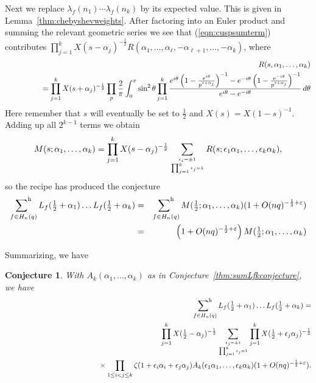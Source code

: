 \documentclass[12pt,letterpaper]{amsart}
\theoremstyle{plain}
\newtheorem{conjecture}[theorem]{Conjecture}
\theoremstyle{definition}
\theoremstyle{remark}
\numberwithin{equation}{subsection}
\numberwithin{theorem}{subsection}
\numberwithin{table}{subsection}
\def\({\left(}
\def\){\right)}
\newcommand{\ontop}[2]{\genfrac{}{}{0pt}{}{#1}{#2}}
\def\sumhar{\operatornamewithlimits{\sum\nolimits^h}}
\begin{document}
Next we replace $\lambda_f(n_1)\cdots \lambda_f(n_k)$ by its
expected value. This is given in Lemma~\ref{thm:chebyshevweights}.
After factoring into an Euler product and summing the relevant
geometric series we see that (\ref{eqn:cuspsumterm}) contributes
$\prod_{j=1}^k
X(s-\alpha_j)^{-\frac12}R(\alpha_1,\dots,\alpha_\ell,-\alpha_{\ell+1},\dots,-\alpha_{k})$,
where
\begin{eqnarray}
&&R(s,\alpha_1,\dots,\alpha_{k})   \cr &&\phantom{XXXX}=
\prod_{j=1}^k X(s +\alpha_j)^{-\frac12 } \prod_p
\frac{2}{\pi}\int_0^\pi \sin^2\theta\prod_{j=1}^k
\frac{e^{i\theta}\left(1-\frac{e^{i\theta}}{p^{s+\alpha_j}}
\right)^{-1} -e^{-i\theta}
\left(1-\frac{e^{-i\theta}}{p^{s+\alpha_j}}\right)^{-1}}{e^{i\theta}-e^{-i\theta}}\,d\theta
\end{eqnarray}
Here remember that $s$ will eventually be set to $\frac12$ and
$X(s)=X(1-s)^{-1}$.  Adding up all $2^{k-1}$ terms we obtain
\begin{equation}
M(s;\alpha_1,\dots,\alpha_k) =
\prod_{j=1}^kX(s-\alpha_j)^{-\frac12}\sum_{\ontop{\epsilon_i=\pm
1}{\prod_{j=1}^k \epsilon_j=1}} R(s; \epsilon_1\alpha_1, \dots,
\epsilon_k\alpha_k),
\end{equation}
so the recipe has produced the conjecture
\begin{eqnarray}
\sumhar_{f\in H_n(q)} L_f(\tfrac12 +\alpha_1)\dots L_f(\tfrac12
+\alpha_k) &=&\sumhar_{f\in H_n(q)}
M(\tfrac12;\alpha_1,\dots,\alpha_k) (1+ O(nq)^{-\frac
12+\varepsilon}) \cr &=& 
\(1+O(nq)^{-\frac12+\varepsilon}\)
M(\tfrac12;\alpha_1,\dots,\alpha_k)
\end{eqnarray}


Summarizing, we have
\begin{conjecture} \label{thm:Zfsumall}
 With
$A_k(\alpha_1,\dots, \alpha_k)$ as in
Conjecture~\ref{thm:sumLfkconjecture}, we have
\begin{eqnarray}&   &\sumhar_{f\in H_n(q)}L_f(\tfrac12 +\alpha_1)\dots L_f(\tfrac12 +\alpha_k)=\nonumber \\
&   &\phantom{xxxxxxxxxx}
    \prod_{j=1}^k X(\tfrac12-\alpha_j)^{-\frac12}\sum _{ \ontop{\epsilon_j=\pm 1}{\prod_{j=1}^k\epsilon_j=1 }}
\prod_{j=1}^k X(\tfrac12 +\epsilon_j\alpha_j)^{-\frac12 }
\nonumber \\
&   &\phantom{xxxxxxxxxxxxxxxxxxxx}\times\prod_{1\le i<j\le
k}\zeta(1+\epsilon_i\alpha_i +\epsilon_j\alpha_j)
 A_k(\epsilon_1\alpha_1,\dots,\epsilon_k\alpha_k)(1 +O(nq)^{-\frac
12+\varepsilon} ).
\end{eqnarray}
\end{conjecture}
\end{document}

